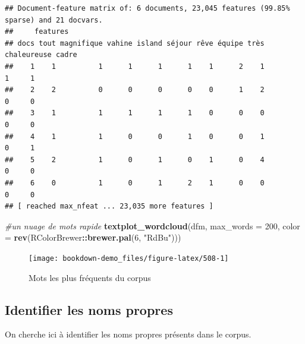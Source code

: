 \documentclass[
]{book}
\newenvironment{Shaded}{\begin{snugshade}}{\end{snugshade}}
\newcommand{\CommentTok}[1]{\textcolor[rgb]{0.56,0.35,0.01}{\textit{#1}}}
\newcommand{\DataTypeTok}[1]{\textcolor[rgb]{0.13,0.29,0.53}{#1}}
\newcommand{\DecValTok}[1]{\textcolor[rgb]{0.00,0.00,0.81}{#1}}
\newcommand{\KeywordTok}[1]{\textcolor[rgb]{0.13,0.29,0.53}{\textbf{#1}}}
\newcommand{\NormalTok}[1]{#1}
\newcommand{\OperatorTok}[1]{\textcolor[rgb]{0.81,0.36,0.00}{\textbf{#1}}}
\newcommand{\StringTok}[1]{\textcolor[rgb]{0.31,0.60,0.02}{#1}}
\begin{document}
\begin{verbatim}
## Document-feature matrix of: 6 documents, 23,045 features (99.85% sparse) and 21 docvars.
##     features
## docs tout magnifique vahine island séjour rêve équipe très chaleureuse cadre
##    1    1          1      1      1      1    1      2    1           1     1
##    2    2          0      0      0      0    0      1    2           0     0
##    3    1          1      1      1      1    0      0    0           0     0
##    4    1          1      0      0      1    0      0    1           0     1
##    5    2          1      0      1      0    1      0    4           0     0
##    6    0          1      0      1      2    1      0    0           0     0
## [ reached max_nfeat ... 23,035 more features ]
\end{verbatim}

\begin{Shaded}
\begin{Highlighting}[]
\CommentTok{#un nuage de mots rapide}
\KeywordTok{textplot_wordcloud}\NormalTok{(dfm, }\DataTypeTok{max_words =} \DecValTok{200}\NormalTok{, }\DataTypeTok{color =} \KeywordTok{rev}\NormalTok{(RColorBrewer}\OperatorTok{::}\KeywordTok{brewer.pal}\NormalTok{(}\DecValTok{6}\NormalTok{, }\StringTok{"RdBu"}\NormalTok{)))}
\end{Highlighting}
\end{Shaded}

\begin{figure}

{\centering \texttt{[image: bookdown-demo\_files/figure-latex/508-1]} 

}

\caption{Mots les plus fréquents du corpus}\label{fig:508}
\end{figure}

\hypertarget{identifier-les-noms-propres}{%
\subsection{Identifier les noms propres}\label{identifier-les-noms-propres}}

On cherche ici à identifier les noms propres présents dans le corpus.
\end{document}
